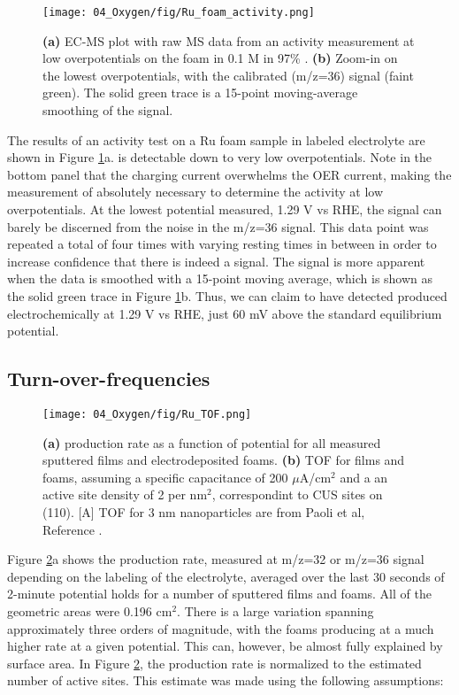 \begin{figure}[h!]
	\centering
	\texttt{[image: 04\_Oxygen/fig/Ru\_foam\_activity.png]}
	\caption{\textbf{(a)} EC-MS plot with raw MS data from an activity measurement at low overpotentials on the  foam in 0.1 M  in 97\% . \textbf{(b)} Zoom-in on the lowest overpotentials, with the calibrated  (m/z=36) signal (faint green). The solid green trace is a 15-point moving-average smoothing of the  signal.}
	\label{fig:Ru_foam_activity}
\end{figure}

The results of an activity test on a Ru foam sample in labeled electrolyte are shown in Figure \ref{fig:Ru_foam_activity}a.  is detectable down to very low overpotentials. Note in the bottom panel that the charging current overwhelms the OER current, making the measurement of  absolutely necessary to determine the activity at low overpotentials. At the lowest potential measured, 1.29 V vs RHE, the signal can barely be discerned from the noise in the m/z=36 signal. This data point was repeated a total of four times with varying resting times in between in order to increase confidence that there is indeed a signal. The signal is more apparent when the data is smoothed with a 15-point moving average, which is shown as the solid green trace in Figure \ref{fig:Ru_foam_activity}b. Thus, we can claim to have detected  produced electrochemically at 1.29 V vs RHE, just 60 mV above the standard equilibrium potential.


\subsection{Turn-over-frequencies}\label{subsec:TOF}

\begin{figure}[h!]
	\centering
	\texttt{[image: 04\_Oxygen/fig/Ru\_TOF.png]}
	\caption{\textbf{(a)}  production rate as a function of potential for all measured sputtered  films and electrodeposited  foams. \textbf{(b)} TOF for films and foams, assuming a specific capacitance of 200 $\mu$A/cm$^2$ and a an active site density of 2 per nm$^2$, correspondint to CUS sites on (110)\cite{Rao2017a}. [A] TOF for 3 nm  nanoparticles are from Paoli et al, Reference .}
	\label{fig:Ru_TOF}
\end{figure}

Figure \ref{fig:Ru_TOF}a shows the  production rate, measured at m/z=32 or m/z=36 signal depending on the labeling of the electrolyte, averaged over the last 30 seconds of 2-minute potential holds for a number of  sputtered films and  foams. All of the geometric areas were 0.196 cm$^2$. There is a large variation spanning approximately three orders of magnitude, with the  foams producing  at a much higher rate at a given potential. This can, however, be almost fully explained by surface area. In Figure \ref{fig:Ru_TOF}, the  production rate is normalized to the estimated number of active sites. This estimate was made using the following assumptions:

